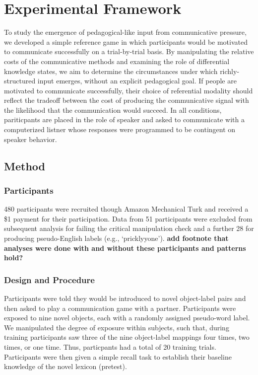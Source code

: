 \documentclass[10pt, letterpaper]{article}
\begin{document}
\hypertarget{experimental-framework}{%
\section{Experimental Framework}\label{experimental-framework}}

To study the emergence of pedagogical-like input from communicative
pressure, we developed a simple reference game in which participants
would be motivated to communicate successfully on a trial-by-trial
basis. By manipulating the relative costs of the communicative methods
and examining the role of differential knowledge states, we aim to
determine the circumstances under which richly-structured input emerges,
without an explicit pedagogical goal. If people are motivated to
communicate successfully, their choice of referential modality should
reflect the tradeoff between the cost of producing the communicative
signal with the likelihood that the communication would succeed. In all
conditions, pariticpants are placed in the role of speaker and asked to
communicate with a computerized listner whose responses were programmed
to be contingent on speaker behavior.

\hypertarget{method}{%
\subsection{Method}\label{method}}

\hypertarget{participants}{%
\subsubsection{Participants}\label{participants}}

480 participants were recruited though Amazon Mechanical Turk and
received a \$1 payment for their participation. Data from 51
participants were excluded from subsequent analysis for failing the
critical manipulation check and a further 28 for producing
pseudo-English labels (e.g., `pricklyyone'). \textbf{add footnote that
analyses were done with and without these participants and patterns
hold?}

\hypertarget{design-and-procedure}{%
\subsubsection{Design and Procedure}\label{design-and-procedure}}

Participants were told they would be introduced to novel object-label
pairs and then asked to play a communication game with a partner.
Participants were exposed to nine novel objects, each with a randomly
assigned pseudo-word label. We manipulated the degree of exposure within
subjects, such that, during training participants saw three of the nine
object-label mappings four times, two times, or one time. Thus,
particpants had a total of 20 training trials. Participants were then
given a simple recall task to establish their baseline knowledge of the
novel lexicon (pretest).
\end{document}
